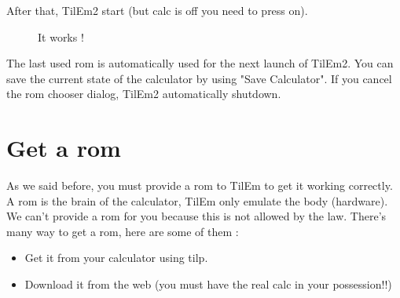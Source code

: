 \documentclass[10pt]{report}
\begin{document}
After that, TilEm2 start (but calc is off you need to press on).\newline
\begin{figure}[H]
\centering
{}
\caption{It works !}
\end{figure}
The last used rom is automatically used for the next launch of TilEm2.\newline
You can save the current state of the calculator by using "Save Calculator".\newline
If you cancel the rom chooser dialog, TilEm2 automatically shutdown.\newline

\chapter{Get a rom}

As we said before, you must provide a rom to TilEm to get it working correctly.\newline
A rom is the brain of the calculator, TilEm only emulate the body (hardware).\newline
We can't provide a rom for you because this is not allowed by the law.\newline
There's many way to get a rom, here are some of them : \newline
\begin{itemize}
\item Get it from your calculator using tilp.
\item Download it from the web (you must have the real calc in your possession!!)
\end{itemize}
\end{document}
